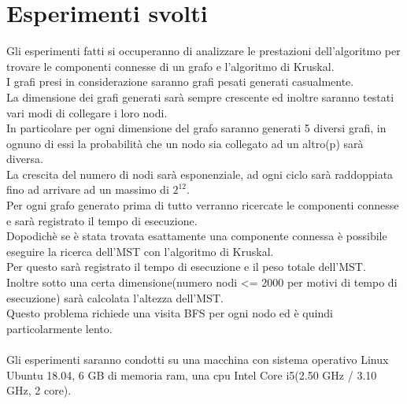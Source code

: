 \documentclass[]{article}
\begin{document}
\section{Esperimenti svolti}
Gli esperimenti fatti si occuperanno di analizzare le prestazioni dell'algoritmo per trovare le componenti connesse di un grafo e l'algoritmo di Kruskal.\\
I grafi presi in considerazione saranno grafi pesati generati casualmente.\\
La dimensione dei grafi generati sarà sempre crescente ed inoltre saranno testati vari modi di collegare i loro nodi.\\
In particolare per ogni dimensione del grafo saranno generati 5 diversi grafi, in ognuno di essi la probabilità che un nodo sia collegato ad un altro(p) sarà diversa.\\
La crescita del numero di nodi sarà esponenziale, ad ogni ciclo sarà raddoppiata fino ad arrivare ad un massimo di $2^{12}$.\\
Per ogni grafo generato prima di tutto verranno ricercate le componenti connesse e sarà registrato il tempo di esecuzione.\\
Dopodichè se è stata trovata esattamente una componente connessa è possibile eseguire la ricerca dell'MST con l'algoritmo di Kruskal.\\
Per questo sarà registrato il tempo di esecuzione e il peso totale dell'MST.\\
Inoltre sotto una certa dimensione(numero nodi <= 2000 per motivi di tempo di esecuzione) sarà calcolata l'altezza dell'MST.\\
Questo problema richiede una visita BFS per ogni nodo ed è quindi particolarmente lento.\\
\\
Gli esperimenti saranno condotti su una macchina con sistema operativo Linux Ubuntu 18.04, 6 GB di memoria ram, una cpu Intel Core i5(2.50 GHz / 3.10 GHz, 2 core).
\end{document}
